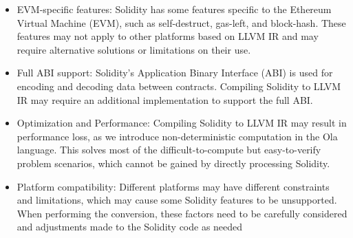 \begin{itemize}
    \item EVM-specific features: Solidity has some features specific to the Ethereum Virtual Machine (EVM), such as self-destruct, gas-left, and block-hash. These features may not apply to other platforms based on LLVM IR and may require alternative solutions or limitations on their use.

    \item Full ABI support: Solidity's Application Binary Interface (ABI) is used for encoding and decoding data between contracts. Compiling Solidity to LLVM IR may require an additional implementation to support the full ABI.

    \item Optimization and Performance: Compiling Solidity to LLVM IR may result in performance loss, as we introduce non-deterministic computation in the Ola language. This solves most of the difficult-to-compute but easy-to-verify problem scenarios, which cannot be gained by directly processing Solidity.

    \item Platform compatibility: Different platforms may have different constraints and limitations, which may cause some Solidity features to be unsupported. When performing the conversion, these factors need to be carefully considered and adjustments made to the Solidity code as needed
\end{itemize}
